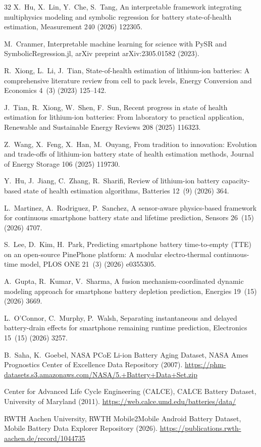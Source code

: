 \documentclass[a4paper,fleqn]{cas-sc}
\begin{document}
\begin{thebibliography}{32}
X.~Hu, X.~Lin, Y.~Che, S.~Tang, An interpretable framework integrating multiphysics modeling and symbolic regression for battery state-of-health estimation, Measurement 240 (2026) 122305.

M.~Cranmer, Interpretable machine learning for science with PySR and SymbolicRegression.jl, arXiv preprint arXiv:2305.01582 (2023).

R.~Xiong, L.~Li, J.~Tian, State-of-health estimation of lithium-ion batteries: A comprehensive literature review from cell to pack levels, Energy Conversion and Economics 4~(3) (2023) 125--142.

J.~Tian, R.~Xiong, W.~Shen, F.~Sun, Recent progress in state of health estimation for lithium-ion batteries: From laboratory to practical application, Renewable and Sustainable Energy Reviews 208 (2025) 116323.

Z.~Wang, X.~Feng, X.~Han, M.~Ouyang, From tradition to innovation: Evolution and trade-offs of lithium-ion battery state of health estimation methods, Journal of Energy Storage 106 (2025) 119730.

Y.~Hu, J.~Jiang, C.~Zhang, R.~Sharifi, Review of lithium-ion battery capacity-based state of health estimation algorithms, Batteries 12~(9) (2026) 364.

L.~Martinez, A.~Rodriguez, P.~Sanchez, A sensor-aware physics-based framework for continuous smartphone battery state and lifetime prediction, Sensors 26~(15) (2026) 4707.

S.~Lee, D.~Kim, H.~Park, Predicting smartphone battery time-to-empty (TTE) on an open-source PinePhone platform: A modular electro-thermal continuous-time model, PLOS ONE 21~(3) (2026) e0355305.

A.~Gupta, R.~Kumar, V.~Sharma, A fusion mechanism-coordinated dynamic modeling approach for smartphone battery depletion prediction, Energies 19~(15) (2026) 3669.

L.~O'Connor, C.~Murphy, P.~Walsh, Separating instantaneous and delayed battery-drain effects for smartphone remaining runtime prediction, Electronics 15~(15) (2026) 3257.

B.~Saha, K.~Goebel, NASA PCoE Li-ion Battery Aging Dataset, NASA Ames Prognostics Center of Excellence Data Repository (2007). \url{https://phm-datasets.s3.amazonaws.com/NASA/5.+Battery+Data+Set.zip}

{Center for Advanced Life Cycle Engineering (CALCE)}, CALCE Battery Dataset, University of Maryland (2011). \url{https://web.calce.umd.edu/batteries/data/}

{RWTH Aachen University}, RWTH Mobile2Mobile Android Battery Dataset, Mobile Battery Data Explorer Repository (2026). \url{https://publications.rwth-aachen.de/record/1044735}

\end{thebibliography}
\end{document}
